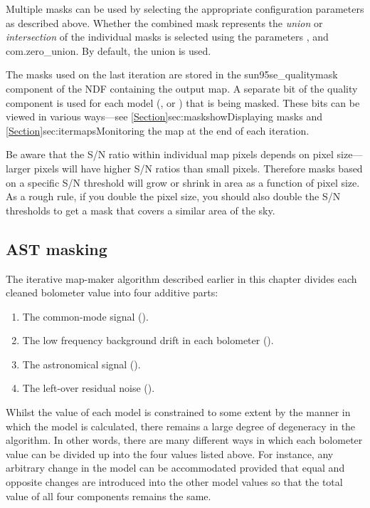 Multiple masks can be used by selecting the appropriate configuration
parameters as described above. Whether the combined mask represents the
\emph{union} or \emph{intersection} of the individual masks is selected
using the parameters ,
 and 
{com.zero\_union}. By default, the union is used.



The masks used on the last iteration are stored in the 
{sun95}{se_qualitymask} component of the NDF containing the output map.
A separate bit of the quality component is used for each model (,
 or ) that is being masked. These bits can be
viewed in various ways---see \cref{Section}{sec:maskshow}{Displaying masks}
and \cref{Section}{sec:itermaps}{Monitoring the map at the end of each
iteration}.

\begin{tip}
Be aware that the S/N ratio within individual map pixels depends on pixel
size---larger pixels will have higher S/N ratios than small pixels.
Therefore masks based on a specific S/N threshold will grow or shrink in
area as a function of pixel size. As a rough rule, if you double the pixel
size, you should also double the S/N thresholds to get a mask that covers a
similar area of the sky.
\end{tip}

\subsection{AST masking}
\label{sec:astmask}
The iterative map-maker algorithm described earlier in this chapter
divides each cleaned bolometer value into four additive parts:
\begin{enumerate}
\item The common-mode signal ().
\item The low frequency background drift in each bolometer ().
\item The astronomical signal ().
\item The left-over residual noise ().
\end{enumerate}

Whilst the value of each model is constrained to some extent by the
manner in which the model is calculated, there remains a large degree of
degeneracy in the algorithm. In other words, there are many different
ways in which each bolometer value can be divided up into the four values
listed above. For instance, any arbitrary change in the  model
can be accommodated provided that equal and opposite changes are introduced
into the other model values so that the total value of all four components
remains the same.

